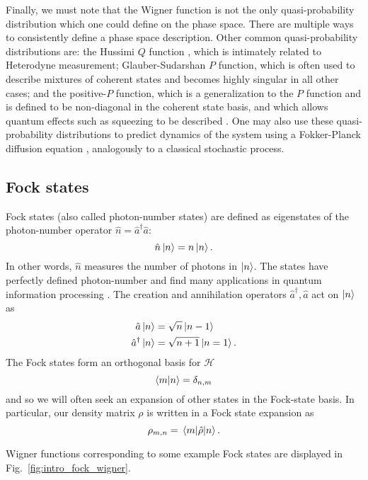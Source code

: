 Finally, we must note that the Wigner function is not the only quasi-probability distribution which one could define on the phase space. There are multiple ways to consistently define a phase space description. Other common quasi-probability distributions are: the Hussimi $Q$ function \cite{Hussimi1940}, which is intimately related to Heterodyne measurement; Glauber-Sudarshan \cite{Glauber1963} $P$ function, which is often used to describe mixtures of coherent states and becomes highly singular in all other cases; and the positive-$P$ function, which is a generalization to the $P$ function and is defined to be non-diagonal in the coherent state basis, and which allows quantum effects such as squeezing to be described \cite{Walls_Millburn_textbok}. One may also use these quasi-probability distributions to predict dynamics of the system using a Fokker-Planck diffusion equation \cite{Carmichael1999}, analogously to a classical stochastic process.


\FloatBarrier
\subsection{Fock states}
Fock states (also called photon-number states) are defined as eigenstates of the photon-number operator $\hat{n} = \hat{a}^\dagger \hat{a}$:
\begin{equation}
\hat{n} \ket{n} = n \ket{n}.
\end{equation}
In other words, $\hat{n}$ measures the number of photons in $\ket{n}$. The states have perfectly defined photon-number and find many applications in quantum information processing \cite{Bennet1984, Adami1999}. The creation and annihilation operators $\hat{a}^\dagger, \hat{a}$ act on $\ket{n}$ as 
\begin{align*}
\hat{a}\ket{n} &= \sqrt{n}\ket{n-1} \\
\hat{a}^\dagger \ket{n} &= \sqrt{n+1} \ket{n=1}.
\end{align*}
The Fock states form an orthogonal basis for $\mathcal{H}$
\begin{equation}
\ip{m}{n} = \delta_{n, m}
\end{equation}
and so we will often seek an expansion of other states in the Fock-state basis. In particular, our density matrix $\rho$ is written in a Fock state expansion as
\begin{equation}
\rho_{m, n} = \mel{m}{\hat{\rho}}{n}.
\end{equation}

\noindent Wigner functions corresponding to some example Fock states are displayed in Fig.~\ref{fig:intro_fock_wigner}.


